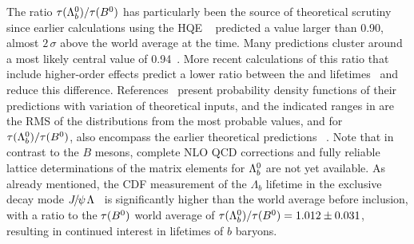 The ratio $\tau(\Lambda_b^0)/\tau(B^0)$ has particularly
been the source of theoretical
scrutiny since earlier calculations using the HQE
~\cite{Shifman:1986mx,*Chay:1990da,*Bigi:1992su,*Bigi:1992su_erratum,Voloshin:1999pz,*Guberina:1999bw,*Neubert:1996we,*Bigi:1997fj}
predicted a value larger than 0.90, almost $2\,\sigma$ 
above the world average at the time. 
Many predictions cluster around a most likely central value
of 0.94~\cite{Uraltsev:1996ta,*Pirjol:1998ur,*Colangelo:1996ta,*DiPierro:1999tb}.
More recent calculations
of this ratio that include higher-order effects predict a
lower ratio between the
\Lb and \Bd lifetimes~\cite{Tarantino:2003qw,*Gabbiani:2003pq,Gabbiani:2004tp}
and reduce this difference.
References~\cite{Tarantino:2003qw,*Gabbiani:2003pq,Gabbiani:2004tp} present probability density functions
of their predictions with variation of theoretical inputs, and the
indicated ranges in 
are the RMS of the distributions from the most probable values, and for 
$\tau(\Lambda_b^0)/\tau(B^0)$, also encompass the earlier theoretical predictions%
~\cite{Shifman:1986mx,*Chay:1990da,*Bigi:1992su,*Bigi:1992su_erratum,Voloshin:1999pz,*Guberina:1999bw,*Neubert:1996we,*Bigi:1997fj,Uraltsev:1996ta,*Pirjol:1998ur,*Colangelo:1996ta,*DiPierro:1999tb}.
Note that in contrast to the $B$ mesons, complete NLO QCD
corrections and
fully reliable lattice
determinations of the matrix elements for $\Lambda_b^0$ are not
yet available.
As already mentioned, the CDF measurement of the $\Lambda_b$ lifetime
in the exclusive decay mode ${J\mskip -3mu/\mskip -2mu\psi\mskip 2mu} \Lambda$~\cite{Aaltonen:2014wfa,*Aaltonen:2014wfa_cont} 
is significantly 
higher than the world average before inclusion, with a ratio
to the $\tau(B^0)$ world average of 
$\tau(\Lambda_b^0)/\tau(B^0) = 1.012 \pm 0.031$, 
%
resulting in continued interest in lifetimes of $b$ baryons.

